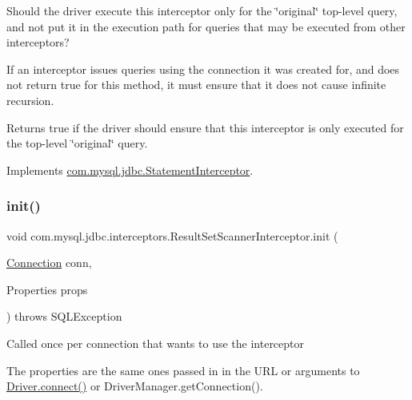Should the driver execute this interceptor only for the \char`\"{}original\char`\"{} top-\/level query, and not put it in the execution path for queries that may be executed from other interceptors?

If an interceptor issues queries using the connection it was created for, and does not return {\ttfamily true} for this method, it must ensure that it does not cause infinite recursion.

\begin{DoxyReturn}{Returns}
true if the driver should ensure that this interceptor is only executed for the top-\/level \char`\"{}original\char`\"{} query. 
\end{DoxyReturn}


Implements \mbox{\hyperlink{interfacecom_1_1mysql_1_1jdbc_1_1_statement_interceptor_a445950e1035a2519be9d5fbaf1fe1b8c}{com.\+mysql.\+jdbc.\+Statement\+Interceptor}}.

\mbox{\label{classcom_1_1mysql_1_1jdbc_1_1interceptors_1_1_result_set_scanner_interceptor_a05bd31d17303e90f2933891426772f11}} 
\subsubsection{\texorpdfstring{init()}{init()}}
{\footnotesize\ttfamily void com.\+mysql.\+jdbc.\+interceptors.\+Result\+Set\+Scanner\+Interceptor.\+init (\begin{DoxyParamCaption}\item[{\mbox{\hyperlink{interfacecom_1_1mysql_1_1jdbc_1_1_connection}{Connection}}}]{conn,  }\item[{Properties}]{props }\end{DoxyParamCaption}) throws S\+Q\+L\+Exception}

Called once per connection that wants to use the interceptor

The properties are the same ones passed in in the U\+RL or arguments to \mbox{\hyperlink{classcom_1_1mysql_1_1jdbc_1_1_non_registering_driver_a834c012e752a01d1ee435b3461bb8218}{Driver.\+connect()}} or Driver\+Manager.\+get\+Connection().


